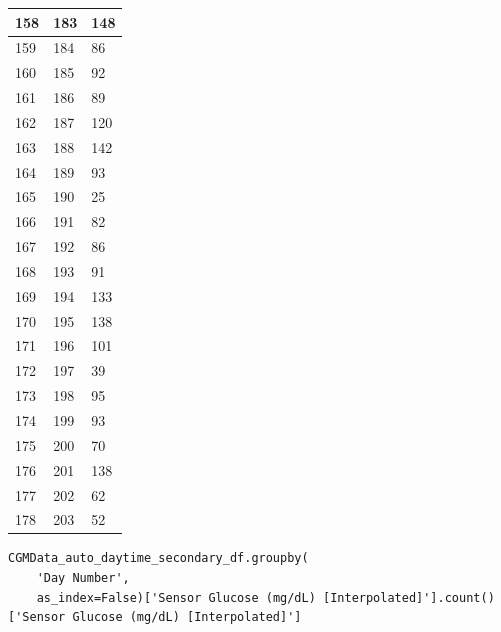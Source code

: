 \begin{tabular}{p{}p{}p{}}
\hline
158 & 183 & 148 \\
\hline
159 & 184 & 86 \\
\hline
160 & 185 & 92 \\
\hline
161 & 186 & 89 \\
\hline
162 & 187 & 120 \\
\hline
163 & 188 & 142 \\
\hline
164 & 189 & 93 \\
\hline
165 & 190 & 25 \\
\hline
166 & 191 & 82 \\
\hline
167 & 192 & 86 \\
\hline
168 & 193 & 91 \\
\hline
169 & 194 & 133 \\
\hline
170 & 195 & 138 \\
\hline
171 & 196 & 101 \\
\hline
172 & 197 & 39 \\
\hline
173 & 198 & 95 \\
\hline
174 & 199 & 93 \\
\hline
175 & 200 & 70 \\
\hline
176 & 201 & 138 \\
\hline
177 & 202 & 62 \\
\hline
178 & 203 & 52 \\
\hline
\bottomrule
\end{tabular}

\bigskip

\begin{verbatim}
CGMData_auto_daytime_secondary_df.groupby(
    'Day Number', 
    as_index=False)['Sensor Glucose (mg/dL) [Interpolated]'].count()['Sensor Glucose (mg/dL) [Interpolated]']
\end{verbatim}

